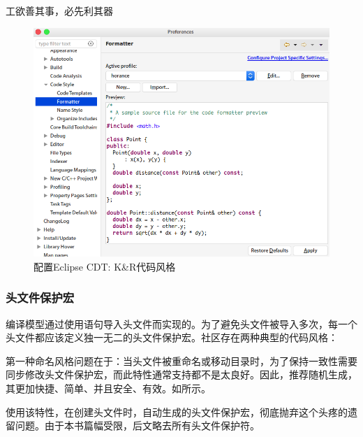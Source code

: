 \begin{content}
\begin{episode}{工欲善其事，必先利其器}
\begin{content}
\begin{figure}[H]
\centering
\includegraphics[width=1.0\textwidth]{figures/xunit/eclipse-formatter.png}
\caption{配置Eclipse CDT: K\&R代码风格}
 \label{fig:eclipse-formatter}
\end{figure}

\subsubsection{头文件保护宏}

编译模型通过使用语句导入头文件而实现的。为了避免头文件被导入多次，每一个头文件都应该定义独一无二的头文件保护宏。社区存在两种典型的代码风格：

\begin{enum}
\end{enum}

第一种命名风格问题在于：当头文件被重命名或移动目录时，为了保持一致性需要同步修改头文件保护宏，而此特性通常支持都不是太良好。因此，推荐随机生成，其更加快捷、简单、并且安全、有效。如所示。

使用该特性，在创建头文件时，自动生成的头文件保护宏，彻底抛弃这个头疼的遗留问题。由于本书篇幅受限，后文略去所有头文件保护符。


\end{content}
\end{episode}
\end{content}
